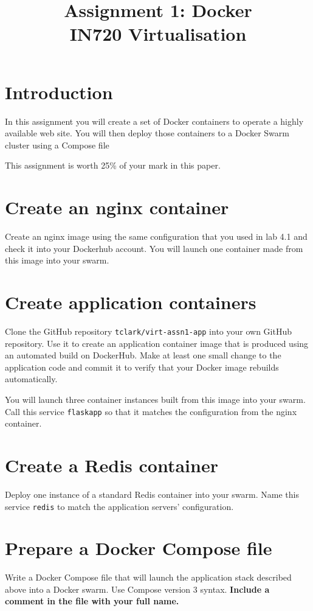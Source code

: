 \documentclass{article}
\begin{document}
\title{Assignment 1: Docker \\ IN720 Virtualisation}
\date{}
\maketitle

\section*{Introduction}
In this assignment you will create a set of Docker containers to operate a highly available web site.  You will then deploy those containers to a Docker Swarm cluster using a Compose file

This assignment is worth 25\% of your mark in this paper.

\section{Create an nginx container}
Create an nginx image using the same configuration that you used in lab 4.1 and check it into your Dockerhub account. You will launch one container made from this image into your swarm.
 
\section{Create application containers}
Clone the GitHub repository \texttt{tclark/virt-assn1-app} into your own GitHub repository. Use it to create an application container image that is produced using an automated build on DockerHub. Make at least one small change to the application code and commit it to verify that your Docker image rebuilds automatically.

You will launch three container instances built from this image into your swarm. Call this service \texttt{flaskapp} so that it matches the configuration from the nginx container. 

\section{Create a Redis container}
Deploy one instance of a standard Redis container into your swarm. Name this service \texttt{redis} to match the application servers' configuration.

\section{Prepare a Docker Compose file}
Write a Docker Compose file that will launch the application stack described above into a Docker swarm. Use Compose version 3 syntax. \textbf{Include a comment in the file with your full name.}
\end{document}
